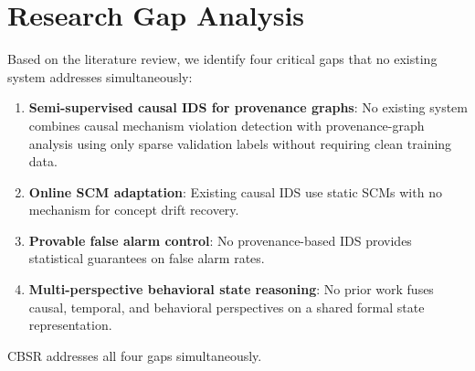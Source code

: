 \section{Research Gap Analysis}

Based on the literature review, we identify four critical gaps that no existing system addresses
simultaneously:

\begin{enumerate}
\item \textbf{Semi-supervised causal IDS for provenance graphs}: No existing system combines causal
    mechanism violation detection with provenance-graph analysis using only sparse validation labels
    without requiring clean training data.
\item \textbf{Online SCM adaptation}: Existing causal IDS use static SCMs with no mechanism for
    concept drift recovery.
\item \textbf{Provable false alarm control}: No provenance-based IDS provides statistical
    guarantees on false alarm rates.
\item \textbf{Multi-perspective behavioral state reasoning}: No prior work fuses causal,
    temporal, and behavioral perspectives on a shared formal state representation.
\end{enumerate}

CBSR addresses all four gaps simultaneously.
